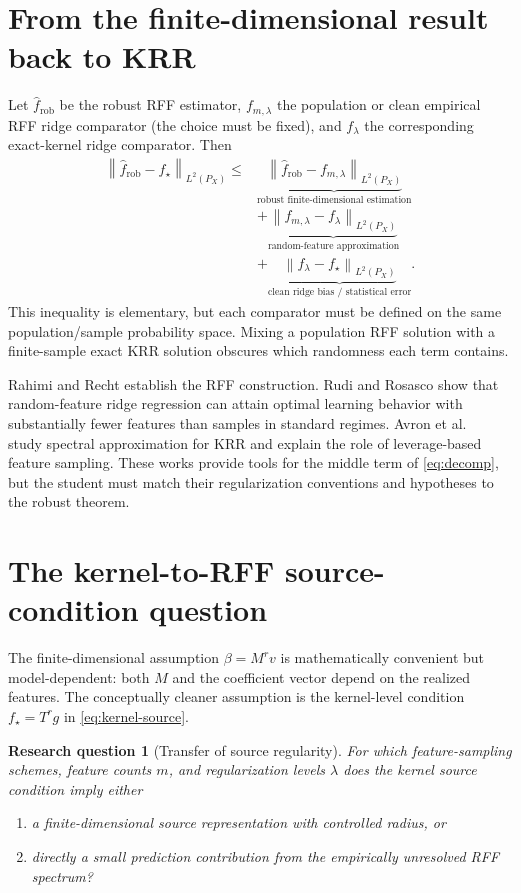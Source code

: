 \documentclass[11pt]{article}
\newtheorem{question}[definition]{Research question}
\newcommand{\norm}[1]{\left\lVert #1\right\rVert}
\begin{document}
\section{From the finite-dimensional result back to KRR}

Let $\widehat f_{\mathrm{rob}}$ be the robust RFF estimator,
$f_{m,\lambda}$ the population or clean empirical RFF ridge comparator (the
choice must be fixed), and $f_\lambda$ the corresponding exact-kernel ridge
comparator.  Then
\begin{align}
 \norm{\widehat f_{\mathrm{rob}}-f_\star}_{L^2(P_X)}
 \leq{}&
 \underbrace{\norm{\widehat f_{\mathrm{rob}}-f_{m,\lambda}}_{L^2(P_X)}}_
 {\text{robust finite-dimensional estimation}}\nonumber\\
 &+\underbrace{\norm{f_{m,\lambda}-f_\lambda}_{L^2(P_X)}}_
 {\text{random-feature approximation}}\nonumber\\
 &+\underbrace{\norm{f_\lambda-f_\star}_{L^2(P_X)}}_
 {\text{clean ridge bias / statistical error}}.
 \label{eq:decomp}
\end{align}
This inequality is elementary, but each comparator must be defined on the same
population/sample probability space.  Mixing a population RFF solution with a
finite-sample exact KRR solution obscures which randomness each term contains.

Rahimi and Recht \cite{rahimi2007} establish the RFF construction.  Rudi and
Rosasco \cite{rudi2017} show that random-feature ridge regression can attain
optimal learning behavior with substantially fewer features than samples in
standard regimes.  Avron et al.\ \cite{avron2017} study spectral approximation
for KRR and explain the role of leverage-based feature sampling.  These works
provide tools for the middle term of \eqref{eq:decomp}, but the student must
match their regularization conventions and hypotheses to the robust theorem.

\section{The kernel-to-RFF source-condition question}

The finite-dimensional assumption $\beta=M^rv$ is mathematically convenient
but model-dependent: both $M$ and the coefficient vector depend on the realized
features.  The conceptually cleaner assumption is the kernel-level condition
$f_\star=T^rg$ in \eqref{eq:kernel-source}.

\begin{question}[Transfer of source regularity]
For which feature-sampling schemes, feature counts $m$, and regularization
levels $\lambda$ does the kernel source condition imply either
\begin{enumerate}[label=(\roman*)]
 \item a finite-dimensional source representation with controlled radius, or
 \item directly a small prediction contribution from the empirically
       unresolved RFF spectrum?
\end{enumerate}
\end{question}
\end{document}
